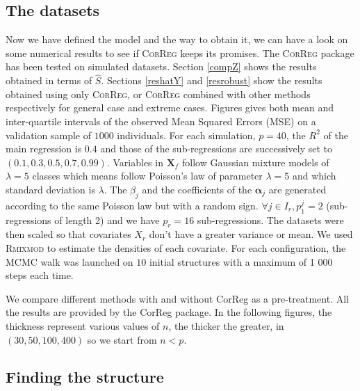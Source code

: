 \documentclass[11pt,a4paper]{article}
\begin{document}
	\subsection{The datasets}	
	Now we have defined the model and the way to obtain it, we can have a look on some numerical results to see if \textsc{CorReg} 	keeps its promises.
	The \textsc{CorReg} package has been tested on simulated datasets. 
Section \ref{compZ} shows the results obtained in terms of $\hat{S}$. Sections \ref{reshatY} and \ref{resrobust} show the results obtained using only \textsc{CorReg}, or \textsc{CorReg} combined with other methods respectively for general case and extreme cases. Figures gives both mean and inter-quartile intervals of the observed Mean Squared Errors (MSE) on a validation sample of $1 000$ individuals. For each simulation,  $p=40$, the $R^2$ of the main regression is $0.4$ and those of the sub-regressions are successively set to $(0.1,0.3,0.5,0.7,0.99)$. Variables in $\boldsymbol{X}_f$ follow Gaussian mixture models of $\lambda=5$ classes which means follow Poisson's law of parameter $\lambda=5$ and which standard deviation is $\lambda$. The $\beta_j$ and the coefficients of the $\boldsymbol{\alpha}_j$ are generated according to the same Poisson law but with a random sign. $\forall j \in I_r, p_1^j=2$ (sub-regressions of length 2) and we have $p_r=16$ sub-regressions. The datasets were then scaled so that covariates $X_r$ don't have a greater variance or mean.
	We used \textsc{Rmixmod} to estimate the densities of each covariate. For each configuration, the MCMC walk was launched on $10$ initial structures with a maximum of 1 000 steps each time.

	We compare different methods with and without CorReg as a pre-treatment. All the results are provided by the CorReg package. In the following figures, the thickness represent various values of $n$, the thicker the greater, in $(30,50,100,400)$ so we start from $n<p$.
		\subsection{Finding the structure}
\end{document}
